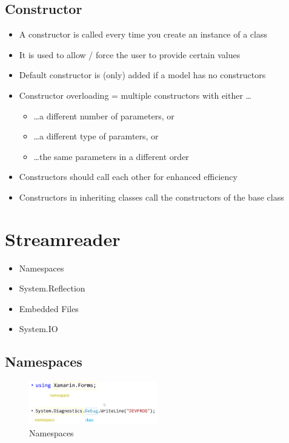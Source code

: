 \documentclass{article}
\begin{document}
\subsection{Constructor}

\begin{itemize}
    \item A constructor is called every time you create an instance of a class
    \item It is used to allow / force the user to provide certain values
    \item Default constructor is (only) added if a model has no constructors
    \item Constructor overloading = multiple constructors with either \dots
    \begin{itemize}
        \item \dots a different number of parameters, or
        \item \dots a different type of paramters, or
        \item \dots the same parameters in a different order
    \end{itemize}
    \item Constructors should call each other for enhanced efficiency
    \item Constructors in inheriting classes call the constructors of the base class
\end{itemize}


\section{Streamreader}

\begin{itemize}
    \item Namespaces
    \item System.Reflection
    \item Embedded Files
    \item System.IO
\end{itemize}

\subsection{Namespaces}

\begin{figure}[H]
    \centering
    \includegraphics[width=0.5\textwidth]{namespaces.png}
    \caption{Namespaces}
\end{figure}
\end{document}
